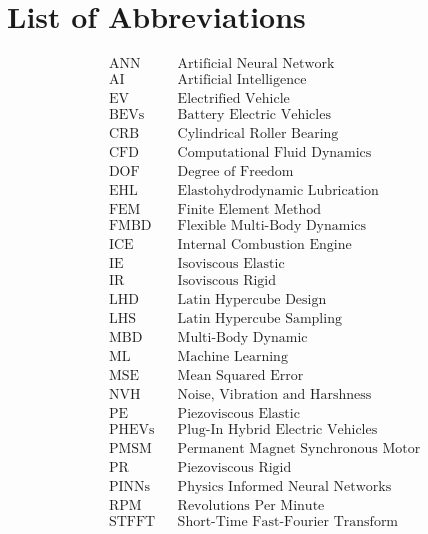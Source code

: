 
\chapter*{List of Abbreviations}
\begin{align*}
	&\text{ANN} &&\text{Artificial Neural Network}\\
	&\text{AI} &&\text{Artificial Intelligence}\\
	&\text{EV} &&\text{Electrified Vehicle}\\
	&\text{BEVs} &&\text{Battery Electric Vehicles}\\
	&\text{CRB} &&\text{Cylindrical Roller Bearing}\\
	&\text{CFD} &&\text{Computational Fluid Dynamics}\\
	&\text{DOF} &&\text{Degree of Freedom}\\
	&\text{EHL} &&\text{Elastohydrodynamic Lubrication}\\
	&\text{FEM} &&\text{Finite Element Method}\\
	&\text{FMBD} &&\text{Flexible Multi-Body Dynamics}\\
	&\text{ICE} &&\text{Internal Combustion Engine}\\
	&\text{IE} &&\text{Isoviscous Elastic}\\
	&\text{IR} &&\text{Isoviscous Rigid}\\
	&\text{LHD} &&\text{Latin Hypercube Design}\\
	&\text{LHS} &&\text{Latin Hypercube Sampling}\\
	&\text{MBD} &&\text{Multi-Body Dynamic}\\
	&\text{ML} &&\text{Machine Learning}\\
	&\text{MSE} &&\text{Mean Squared Error}\\
	&\text{NVH} &&\text{Noise, Vibration and Harshness}\\
	&\text{PE} &&\text{Piezoviscous Elastic}\\
	&\text{PHEVs} &&\text{Plug-In Hybrid Electric Vehicles}\\
	&\text{PMSM} &&\text{Permanent Magnet Synchronous Motor}\\
	&\text{PR} &&\text{Piezoviscous Rigid}\\
	&\text{PINNs} &&\text{Physics Informed Neural Networks}\\
	&\text{RPM} &&\text{Revolutions Per Minute}\\
	&\text{STFFT} &&\text{Short-Time Fast-Fourier Transform}\\
\end{align*}
